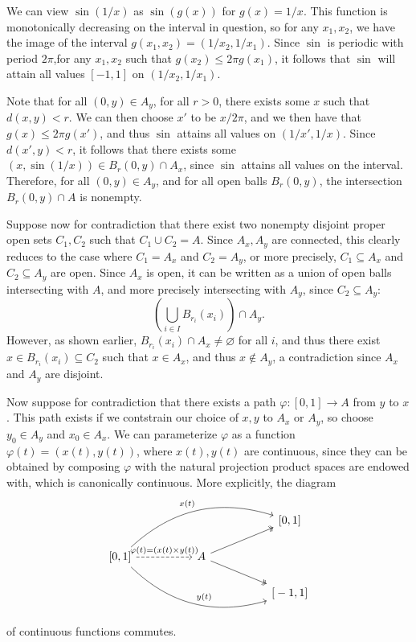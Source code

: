 \documentclass[11pt, letterpaper]{article}
\begin{document}
We can view $\sin (1/x)$ as $\sin (g(x))$ for $g(x)=1/x$. This function is monotonically decreasing on the interval in question, so for any $x_1,x_2$, we have the image of the interval $g(x_1,x_2)=(1/x_2,1/x_1)$. Since $\sin $ is periodic with period $2\pi $,for any $x_1,x_2$ such that $g(x_2)\leq 2\pi g(x_1)$, it follows that $\sin $ will attain all values $[-1,1]$ on $(1/x_2,1/x_1)$. 

Note that for all $(0,y)\in A_y$, for all $r>0$, there exists some $x$ such that $d(x,y)<r$. We can then choose $x'$ to be $x/2\pi $, and we then have that $g(x)\leq 2\pi g(x')$, and thus $\sin $ attains all values on $(1/x',1/x)$. Since $d(x',y)<r$, it follows that there exists some $(x,\sin (1/x))\in B_r(0,y) \cap A_x$, since $\sin $ attains all values on the interval. Therefore, for all $(0,y)\in A_y$, and for all open balls $B_r(0,y)$, the intersection $B_r(0,y) \cap  A$ is nonempty.

Suppose now for contradiction that there exist two nonempty disjoint proper open sets $C_1,C_2$ such that $C_1 \cup C_2=A$. Since $A_x,A_y$ are connected, this clearly reduces to the case where $C_1=A_x$ and $C_2=A_y$, or more precisely, $C_1 \subseteq A_x$ and $C_2 \subseteq A_y$ are open. Since $A_x$ is open, it can be written as a union of open balls intersecting with $A$, and more precisely intersecting with $A_y$, since $C_2 \subseteq A_y$:
\[
	\left(\bigcup_{i\in I} B_{r_i} (x_i)\right) \cap A_y
.\]
However, as shown earlier, $B_{r_i} (x_i) \cap A_x\neq \varnothing $ for all $i$, and thus there exist $x\in B_{r_i} (x_i)\subseteq C_2$ such that $x\in A_x$, and thus $x\notin A_y$, a contradiction since $A_x$ and $A_y$ are disjoint.

Now suppose for contradiction that there exists a path $\varphi : [0,1] \to A$ from $y$ to $x$. This path exists if we contstrain our choice of $x,y$ to $A_x$ or $A_y$, so choose $y_0\in A_y$ and $x_0\in A_x$. We can parameterize $\varphi $ as a function $\varphi (t)=(x(t),y(t))$, where $x(t),y(t) $ are continuous, since they can be obtained by composing $\varphi $ with the natural projection product spaces are endowed with, which is canonically continuous. More explicitly, the diagram
\[\begin{tikzcd}[row sep = 1.5em, column sep = 5em]
	&&\text{[}0,1\text{]} \\
	\text{[} 0,1\text{]} \ar[urr, bend left, "x(t)"]\ar[drr, bend right, "y(t)"]\ar[r, dashed, "\varphi (t)=(x(t)\times y(t))"]&A\ar[ur, two heads]\ar[dr, two heads]\\
																   &&\text{[} -1,1\text{]} 
\end{tikzcd}\]
of continuous functions commutes.
\end{document}
